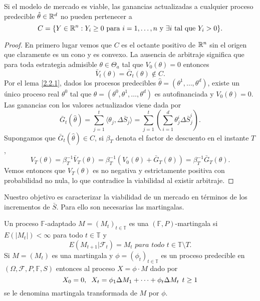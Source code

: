\begin{lemaBox}\label{3.2.1}
	Si el modelo de mercado es viable, las ganancias actualizadas a cualquier proceso predecible $ \hat{\theta} \in \mathbb{R} ^d $ no pueden pertenecer a 
	\[
	C = \{Y \in \mathbb{R}^n: Y_i \geq 0\text{ para } i=1,\dots,n \text{ y } \exists i \text{ tal que } Y_i > 0\}.
	\]
\end{lemaBox}
\begin{proof}
En primero lugar vemos que $ C $ es el octante positivo de $ \mathbb{R}^n $ sin el origen que claramente es un cono y es convexo. La ausencia de arbitraje significa que para toda estrategia admisible $ \theta \in \Theta_a $ tal que $ V_0(\theta) = 0 $ entonces
\[
\bar{V}_t(\theta) = \bar{G}_t (\theta) \notin C.
\]
Por el lema \ref{2.2.1}, dados los procesos predecibles $ \hat{\theta} = (\theta^1, \dots,\theta^d) $, existe un único proceso real $ \theta^0 $ tal que $ \theta = (\theta^0, \theta^1,\dots, \theta^d) $ es autofinanciada y $ V_0(\theta) = 0 $. Las ganancias con los valores actualizados viene dada por
\[
\bar{G}_t(\hat{\theta}) = \sum_{j=1}^{t} \langle \theta_j, \Delta \bar{S}_j \rangle =   \sum_{j=1}^{t} \left( \sum_{i=1}^{d} \theta_j^i \Delta \bar{S}_j^i  \right).
\]
Supongamos que $ \bar{G}_t(\hat{\theta}) \in C $, si $ \beta_T $ denota el factor de descuento en el instante $ T $,
\[
V_T(\theta) = \beta_T^{-1} \bar{V}_T(\theta) = \beta_T^{-1}(V_0 (\theta) + \bar{G}_T(\theta)) = \beta_T^{-1}\bar{G}_T(\theta).
\]
Vemos entonces que $ V_T(\theta) $ es no negativa y estrictamente positiva con probabilidad no nula, lo que contradice la viabilidad al existir arbitraje.
\end{proof}

Nuestro objetivo es caracterizar la viabilidad de un mercado en términos de los incrementos de $ \bar{S} $. Para ello son necesarias las martingalas.
\begin{definicion}
Un proceso $ \mathbb{F} $-adaptado $ M = (M_t)_{t\in \mathbb{T}} $ es una $ ( \mathbb{F},P) $-martingala si $ E(|M_t|) < \infty $ para todo $ t \in \mathbb{T} $ y 
\[
E(M_{t+1}|\mathcal{F}_t) = M_t \textit{ para todo } t \in \mathbb{T}\setminus{T}.
\]
Si $ M = (M_t) $ es una martingala y $ \phi = (\phi_t)_{t\in \mathbb{T}} $ es un proceso predecible en $ (\Omega, \mathcal{F}, P, \mathbb{F}, S) $ entonces al proceso $ X = \phi \cdot M $ dado por
\[
X_0=0, \hspace{2mm}X_t = \phi_1\Delta M_1+\cdots+ \phi_t\Delta M_t \hspace{1.5mm} t \geq1
\]
se le denomina martingala transformada de $ M $ por $ \phi $.
\end{definicion}

